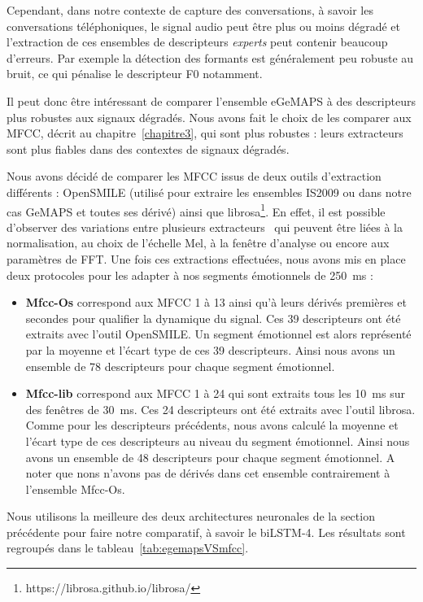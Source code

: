 Cependant, dans notre contexte de capture des conversations, à savoir les conversations téléphoniques, le signal audio peut être plus ou moins dégradé et l'extraction de ces ensembles de descripteurs \textit{experts} peut contenir beaucoup d'erreurs. Par exemple la détection des formants est généralement peu robuste au bruit, ce qui pénalise le descripteur F0 notamment.%

Il peut donc être intéressant de comparer l'ensemble eGeMAPS à des descripteurs plus robustes aux signaux dégradés. Nous avons fait le choix de les comparer aux MFCC, décrit au chapitre~\ref{chapitre3}, qui sont plus robustes : leurs extracteurs sont plus fiables dans des contextes de signaux dégradés.

Nous avons décidé de comparer les MFCC issus de deux outils d'extraction différents : OpenSMILE (utilisé pour extraire les ensembles IS2009 ou dans notre cas GeMAPS et toutes ses dérivé) ainsi que librosa\footnote{https://librosa.github.io/librosa/}. En effet, il est possible d'observer des variations entre plusieurs extracteurs~\cite{Ganchev2005} qui peuvent être liées à la normalisation, au choix de l'échelle Mel, à la fenêtre d'analyse ou encore aux paramètres de FFT. Une fois ces extractions effectuées, nous avons mis en place deux protocoles pour les adapter à nos segments émotionnels de 250~ms :
\begin{itemize}
    \item \textbf{Mfcc-Os} correspond aux MFCC 1 à 13 ainsi qu'à leurs dérivés premières et secondes pour qualifier la dynamique du signal. Ces 39 descripteurs ont été extraits avec l’outil OpenSMILE. Un segment émotionnel est alors représenté par la moyenne et l'écart type de ces 39 descripteurs. Ainsi nous avons un ensemble de 78 descripteurs pour chaque segment émotionnel.
    \item \textbf{Mfcc-lib} correspond aux MFCC 1 à 24 qui sont extraits tous les 10~ms sur des fenêtres de 30~ms. Ces 24 descripteurs ont été extraits avec l'outil librosa. Comme pour les descripteurs précédents, nous avons calculé la moyenne et l'écart type de ces descripteurs au niveau du segment émotionnel. Ainsi nous avons un ensemble de 48 descripteurs pour chaque segment émotionnel. A noter que nons n'avons pas de dérivés dans cet ensemble contrairement à l'ensemble Mfcc-Os.
\end{itemize}

Nous utilisons la meilleure des deux architectures neuronales de la section précédente pour faire notre comparatif, à savoir le biLSTM-4. Les résultats sont regroupés dans le tableau~\ref{tab:egemapsVSmfcc}.

